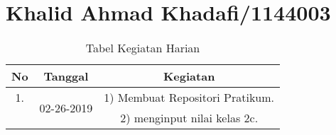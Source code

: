 \chapter{Khalid Ahmad Khadafi/1144003}

\begin{table}[h]
\caption{Tabel Kegiatan Harian}
\centering
\begin{tabular}{|c|c|c|}
\hline
No&Tanggal&Kegiatan\\
\hline
1.&\multirow{2}{*}{02-26-2019}&1) Membuat Repositori Pratikum.\\
&&2) menginput nilai kelas 2c.\\
\hline
\end{tabular}
\label{table:contoh}
\end{table}

